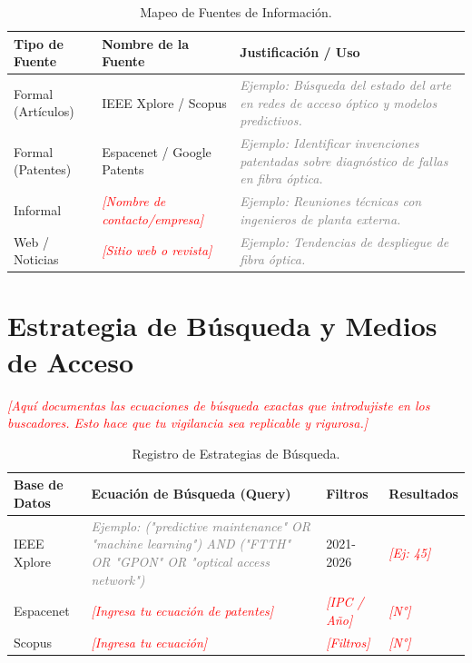 \documentclass[12pt,a4paper]{article}
\newcommand{\instruccion}[1]{\textcolor{red}{\textit{[#1]}}}
\newcommand{\ejemplo}[1]{\textcolor{gray}{\textit{Ejemplo: #1}}}
\begin{document}
\begin{table}[h]
\centering
\renewcommand{\arraystretch}{1.3}
\begin{tabularx}{\textwidth}{|l|l|X|}
\hline
\textbf{Tipo de Fuente} & \textbf{Nombre de la Fuente} & \textbf{Justificación / Uso} \\ \hline
Formal (Artículos) & IEEE Xplore / Scopus & \ejemplo{Búsqueda del estado del arte en redes de acceso óptico y modelos predictivos.} \\ \hline
Formal (Patentes) & Espacenet / Google Patents & \ejemplo{Identificar invenciones patentadas sobre diagnóstico de fallas en fibra óptica.} \\ \hline
Informal & \instruccion{Nombre de contacto/empresa} & \ejemplo{Reuniones técnicas con ingenieros de planta externa.} \\ \hline
Web / Noticias & \instruccion{Sitio web o revista} & \ejemplo{Tendencias de despliegue de fibra óptica.} \\ \hline
\end{tabularx}
\caption{Mapeo de Fuentes de Información.}
\label{tab:fuentes}
\end{table}

\section{Estrategia de Búsqueda y Medios de Acceso}
\instruccion{Aquí documentas las ecuaciones de búsqueda exactas que introdujiste en los buscadores. Esto hace que tu vigilancia sea replicable y rigurosa.}

\vspace{0.5cm}

\begin{table}[h]
\centering
\renewcommand{\arraystretch}{1.3}
\begin{tabularx}{\textwidth}{|l|X|l|l|}
\hline
\textbf{Base de Datos} & \textbf{Ecuación de Búsqueda (Query)} & \textbf{Filtros} & \textbf{Resultados} \\ \hline
IEEE Xplore & \ejemplo{("predictive maintenance" OR "machine learning") AND ("FTTH" OR "GPON" OR "optical access network")} & 2021-2026 & \instruccion{Ej: 45} \\ \hline
Espacenet & \instruccion{Ingresa tu ecuación de patentes} & \instruccion{IPC / Año} & \instruccion{N°} \\ \hline
Scopus & \instruccion{Ingresa tu ecuación} & \instruccion{Filtros} & \instruccion{N°} \\ \hline
\end{tabularx}
\caption{Registro de Estrategias de Búsqueda.}
\label{tab:busqueda}
\end{table}
\end{document}
